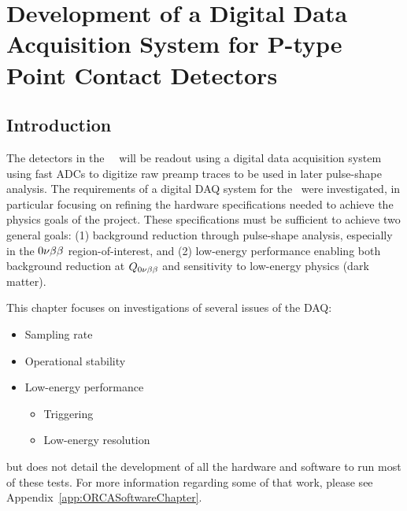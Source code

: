 %
%

\chapter{Development of a Digital Data Acquisition System for P-type Point Contact Detectors}
\label{chap:DAQDevel}
	\section{Introduction} 
	
	The detectors in the \MJ~\minmod~will be readout using a digital data acquisition system using fast ADCs to digitize raw preamp traces to be used in later pulse-shape analysis.  The requirements of a digital DAQ system for the \minmod~were investigated, in particular focusing on refining the hardware specifications needed to achieve the physics goals of the project.  These specifications must be sufficient to achieve two general goals: (1) background reduction through pulse-shape analysis, especially in the $0 \nu \beta \beta$ region-of-interest, and (2) low-energy performance enabling both background reduction at $Q_{0 \nu \beta \beta}$ and sensitivity to low-energy physics (dark matter).  
	
	 This chapter focuses on investigations of several issues of the DAQ:
		\begin{itemize}
			\item Sampling rate 
			\item Operational stability
			\item Low-energy performance
			\begin{itemize}
				\item Triggering
				\item Low-energy resolution
			\end{itemize}	
		\end{itemize}
but does not detail the development of all the hardware and software to run most of these tests.  For more information regarding some of that work, please see Appendix~\ref{app:ORCASoftwareChapter}.  %

